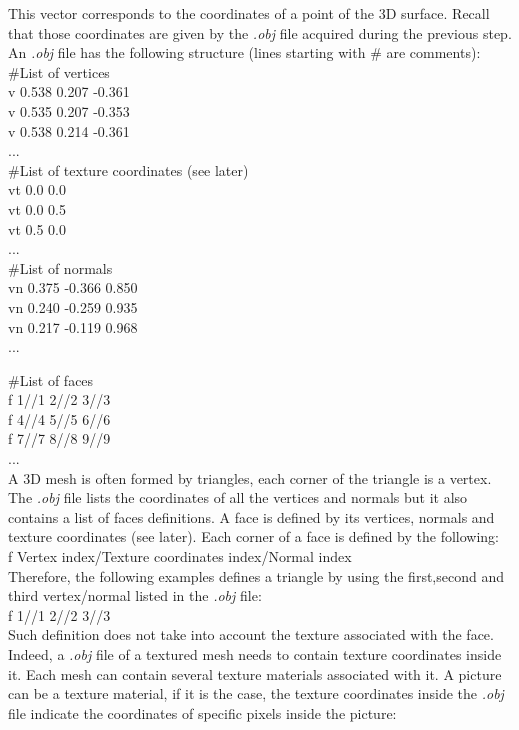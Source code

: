 This vector corresponds to the coordinates of a point of the 3D surface. Recall that those coordinates are given by the \textit{.obj} file acquired during the previous step. An \textit{.obj} file has the following structure (lines starting with \# are comments):\\

\noindent\#List of vertices\\ 
v 0.538 0.207 -0.361\\
v 0.535 0.207 -0.353\\
v 0.538 0.214 -0.361\\
...\\

\noindent\#List of texture coordinates (see later)\\
vt 0.0 0.0\\
vt 0.0 0.5\\
vt 0.5 0.0\\
...\\

\noindent\#List of normals\\
vn 0.375 -0.366 0.850\\
vn 0.240 -0.259 0.935\\
vn 0.217 -0.119 0.968\\
...

\noindent\#List of faces\\
f 1//1 2//2 3//3\\
f 4//4 5//5 6//6\\
f 7//7 8//8 9//9\\
...\\

A 3D mesh is often formed by triangles, each corner of the triangle is a vertex. The \textit{.obj} file lists the coordinates of all the vertices and normals but it also contains a list of faces definitions. A face is defined by its vertices, normals and texture coordinates (see later). Each corner of a face is defined by the following:\\

\noindent f Vertex index/Texture coordinates index/Normal index \\

Therefore, the following examples defines a triangle by using the first,second and third vertex/normal listed in the \textit{.obj} file:\\

\noindent f 1//1 2//2 3//3\\

Such definition does not take into account the texture associated with the face. Indeed, a \textit{.obj} file of a textured mesh needs to contain texture coordinates inside it. Each mesh can contain several texture materials associated with it. A picture can be a texture material, if it is the case, the texture coordinates inside the \textit{.obj} file indicate the coordinates of specific pixels inside the picture: \\


